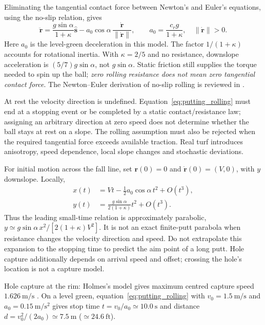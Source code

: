 Eliminating the tangential contact force between Newton's and Euler's equations, using the no-slip relation, gives
\begin{equation}
\ddot{\mathbf r}
=\frac{g\sin\alpha}{1+\kappa}\hat{\mathbf s}
-a_0\cos\alpha\,\frac{\dot{\mathbf r}}{\|\dot{\mathbf r}\|},
\qquad
a_0=\frac{c_rg}{1+\kappa},
\quad \|\dot{\mathbf r}\|>0.
\label{eq:putting_rolling}
\end{equation}
Here $a_0$ is the level-green deceleration in this model. The factor $1/(1+\kappa)$ accounts for rotational inertia. With $\kappa=2/5$ and no resistance, downslope acceleration is $(5/7)g\sin\alpha$, not $g\sin\alpha$. Static friction still supplies the torque needed to spin up the ball; \emph{zero rolling resistance does not mean zero tangential contact force}. The Newton--Euler derivation of no-slip rolling is reviewed in \citet{OpenStaxRollingReview}.

At rest the velocity direction is undefined. Equation~\eqref{eq:putting_rolling} must end at a stopping event or be completed by a static contact/resistance law; assigning an arbitrary direction at zero speed does not determine whether the ball stays at rest on a slope. The rolling assumption must also be rejected when the required tangential force exceeds available traction. Real turf introduces anisotropy, speed dependence, local slope changes and stochastic deviations.

For initial motion across the fall line, set $\mathbf r(0)=0$ and $\dot{\mathbf r}(0)=(V,0)$, with $y$ downslope. Locally,
\begin{align}
x(t)&=Vt-\frac12a_0\cos\alpha\,t^2+O(t^3),\\
y(t)&=\frac{g\sin\alpha}{2(1+\kappa)}t^2+O(t^3).
\end{align}
Thus the leading small-time relation is approximately parabolic,
$y\simeq g\sin\alpha\,x^2/[2(1+\kappa)V^2]$.
It is not an exact finite-putt parabola when resistance changes the velocity direction and speed. Do not extrapolate this expansion to the stopping time to predict the aim point of a long putt. Hole capture additionally depends on arrival speed and offset; crossing the hole's location is not a capture model.

Hole capture at the rim: Holmes's model gives maximum centred capture speed $1.626\ \mathrm{m/s}$ \citep{Holmes1991,penner2002putting}. On a level green, equation~\eqref{eq:putting_rolling} with $v_0=1.5\ \mathrm{m/s}$ and $a_0=0.15\ \mathrm{m/s^2}$ gives stop time $t=v_0/a_0\simeq10.0\ \mathrm s$ and distance $d=v_0^2/(2a_0)\simeq7.5\ \mathrm m$ ($\simeq24.6\ \mathrm{ft}$).

